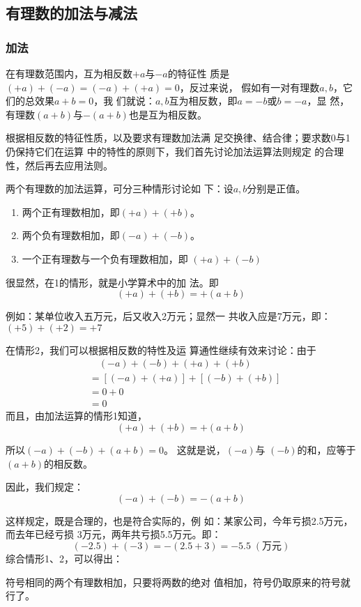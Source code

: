 \subsection{有理数的加法与减法}
\subsubsection{加法}

在有理数范围内，互为相反数$+a$与$-a$的特征性
质是$(+a) + (-a)=(-a) + (+a) = 0$，反过来说，
假如有一对有理数$a,  b$，它们的总效果$a+b= 0$，我
们就说：$a,  b$互为相反数，即$a=-b$或$b=-a$，显
然，有理数$(a + b)$与$-(a + b)$也是互为相反数。

    根据相反数的特征性质，以及要求有理数加法满
足交换律、结合律；要求数0与1仍保持它们在运算
中的特性的原则下，我们首先讨论加法运算法则规定
的合理性，然后再去应用法则。

    两个有理数的加法运算，可分三种情形讨论如
下：设$a,  b$分别是正值。
\begin{enumerate}
    \item 两个正有理数相加，即$(+ a)+(+b)$。
    \item 两个负有理数相加，即$(-a)+(-b)$。
    \item 一个正有理数与一个负有理数相加，即
  $(+a)+(-b)$
\end{enumerate}

    很显然，在1的情形，就是小学算术中的加
法。即
\[(+a)+(+b)=+(a+b)\]

例如：某单位收入五万元，后又收入2万元；显然一
共收入应是7万元，即：$(+5)+(+2)=+7$

    在情形2，我们可以根据相反数的特性及运
算通性继续有效来讨论：由于
\begin{align*}
    &\quad (-a) +(-b) + (+a) + (+b)\\
    &=[(-a)+(+a)]+[(-b)+(+b)]
          \tag{加法交换、结合律}\\
          &=0+0\tag{相反数的特性}\\
          &=0\tag{零的运算}
\end{align*}
而且，由加法运算的情形1知道，
\[(+a)+(+b)=+(a+b)\]

所以$( - a) + (- b) + (a + b) = 0$。
这就是说，$( - a)$与
$(-b)$的和，应等于$(a + b)$的相反数。

因此，我们规定：
\[(-a)+(-b)=-(a+b)\]

这样规定，既是合理的，也是符合实际的，例
如：某家公司，今年亏损2.5万元，而去年已经亏损
3万元，两年共亏损5.5万元。即：
\[(-2. 5)+(-3)=-(2.5+3)=-5.5\; (\text{万元})\]
综合情形1、2，可以得出：
\begin{blk}{}
    符号相同的两个有理数相加，只要将两数的绝对
    值相加，符号仍取原来的符号就行了。
\end{blk}

